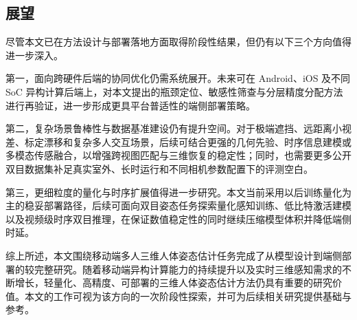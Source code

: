\subsection{展望}

尽管本文已在方法设计与部署落地方面取得阶段性结果，但仍有以下三个方向值得进一步深入。

第一，面向跨硬件后端的协同优化仍需系统展开。未来可在 Android、iOS 及不同 SoC 异构计算后端上，对本文提出的瓶颈定位、敏感性筛查与分层精度分配方法进行再验证，进一步形成更具平台普适性的端侧部署策略。

第二，复杂场景鲁棒性与数据基准建设仍有提升空间。对于极端遮挡、远距离小视差、标定漂移和复杂多人交互场景，后续可结合更强的几何先验、时序信息建模或多模态传感融合，以增强跨视图匹配与三维恢复的稳定性；同时，也需要更多公开双目数据集补足真实室外、长时运行和不同相机参数配置下的评测空白。

第三，更细粒度的量化与时序扩展值得进一步研究。本文当前采用以后训练量化为主的稳妥部署路径，后续可面向双目姿态任务探索量化感知训练、低比特激活建模以及视频级时序双目推理，在保证数值稳定性的同时继续压缩模型体积并降低端侧时延。

综上所述，本文围绕移动端多人三维人体姿态估计任务完成了从模型设计到端侧部署的较完整研究。随着移动端异构计算能力的持续提升以及实时三维感知需求的不断增长，轻量化、高精度、可部署的三维人体姿态估计方法仍具有重要的研究价值。本文的工作可视为该方向的一次阶段性探索，并可为后续相关研究提供基础与参考。

% 
